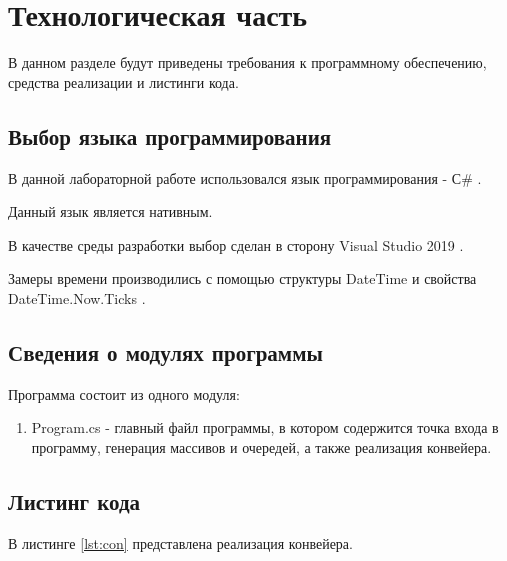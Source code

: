 \chapter{Технологическая часть}
В данном разделе будут приведены требования к программному обеспечению, средства реализации и листинги кода.

\section{Выбор языка программирования}

В данной лабораторной работе использовался язык программирования - С\# \cite{csharplang}.

Данный язык является нативным.

В качестве среды разработки выбор сделан в сторону Visual Studio 2019 \cite{wind}. 

Замеры времени производились с помощью структуры DateTime \cite{csharplang1} и свойства DateTime.Now.Ticks \cite{csharplang2}.

\section{Сведения о модулях программы}
Программа состоит из одного модуля:
\begin{enumerate}
	\item Program.cs - главный файл программы, в котором содержится точка входа в программу, генерация массивов и очередей, а также реализация конвейера.
\end{enumerate}

\section{Листинг кода}

В листинге \ref{lst:con} представлена реализация конвейера.

